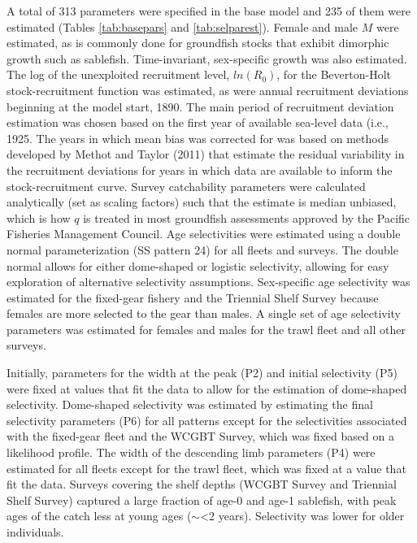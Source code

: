 \documentclass[11pt,
  english,
  a4paper,
]{article}
\begin{document}
A total of 313 parameters were specified in the base model and 235 of them were estimated (Tables \ref{tab:basepars} and \ref{tab:selparest}). Female and male {\(M\)\leavevmode\tagmcend\tagstructend} were estimated, as is commonly done for groundfish stocks that exhibit dimorphic growth such as sablefish. Time-invariant, sex-specific growth was also estimated. The log of the unexploited recruitment level, {\(ln(R_0)\)\leavevmode\tagmcend\tagstructend}, for the Beverton-Holt stock-recruitment function was estimated, as were annual recruitment deviations beginning at the model start, 1890. The main period of recruitment deviation estimation was chosen based on the first year of available sea-level data (i.e., 1925. The years in which mean bias was corrected for was based on methods developed by {Methot and Taylor (2011)\leavevmode\tagmcend\tagstructend} that estimate the residual variability in the recruitment deviations for years in which data are available to inform the stock-recruitment curve. Survey catchability parameters were calculated analytically (set as scaling factors) such that the estimate is median unbiased, which is how {\(q\)\leavevmode\tagmcend\tagstructend} is treated in most groundfish assessments approved by the Pacific Fisheries Management Council. Age selectivities were estimated using a double normal parameterization (SS pattern 24) for all fleets and surveys. The double normal allows for either dome-shaped or logistic selectivity, allowing for easy exploration of alternative selectivity assumptions. Sex-specific age selectivity was estimated for the fixed-gear fishery and the Triennial Shelf Survey because females are more selected to the gear than males. A single set of age selectivity parameters was estimated for females and males for the trawl fleet and all other surveys.

\leavevmode\tagmcend\tagstructend\par


Initially, parameters for the width at the peak (P2) and initial selectivity (P5) were fixed at values that fit the data to allow for the estimation of dome-shaped selectivity. Dome-shaped selectivity was estimated by estimating the final selectivity parameters (P6) for all patterns except for the selectivities associated with the fixed-gear fleet and the WCGBT Survey, which was fixed based on a likelihood profile. The width of the descending limb parameters (P4) were estimated for all fleets except for the trawl fleet, which was fixed at a value that fit the data. Surveys covering the shelf depths (WCGBT Survey and Triennial Shelf Survey) captured a large fraction of age-0 and age-1 sablefish, with peak ages of the catch less at young ages ({\(\sim\)\leavevmode\tagmcend\tagstructend}\textless 2 years). Selectivity was lower for older individuals.
\end{document}
